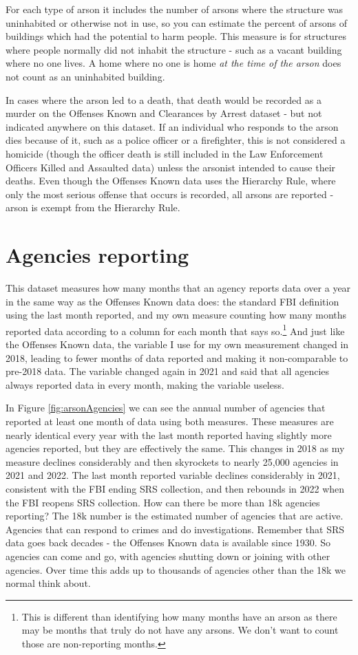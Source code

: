\documentclass[
]{krantz}
\begin{document}
For each type of arson it includes the number of arsons
where the structure was uninhabited or otherwise not in use,
so you can estimate the percent of arsons of buildings which
had the potential to harm people. This measure is for
structures where people normally did not inhabit the
structure - such as a vacant building where no one lives. A
home where no one is home \emph{at the time of the arson}
does not count as an uninhabited building.

In cases where the arson led to a death, that death would be
recorded as a murder on the Offenses Known and Clearances by
Arrest dataset - but not indicated anywhere on this dataset.
If an individual who responds to the arson dies because of
it, such as a police officer or a firefighter, this is not
considered a homicide (though the officer death is still
included in the Law Enforcement Officers Killed and
Assaulted data) unless the arsonist intended to cause their
deaths. Even though the Offenses Known data uses the
Hierarchy Rule, where only the most serious offense that
occurs is recorded, all arsons are reported - arson is
exempt from the Hierarchy Rule.

\section{Agencies reporting}\label{agencies-reporting-4}

This dataset measures how many months that an agency reports
data over a year in the same way as the Offenses Known data
does: the standard FBI definition using the last month
reported, and my own measure counting how many months
reported data according to a column for each month that says
so.\footnote{This is different than identifying how many
  months have an arson as there may be months that truly do
  not have any arsons. We don't want to count those are
  non-reporting months.} And just like the Offenses Known
data, the variable I use for my own measurement changed in
2018, leading to fewer months of data reported and making it
non-comparable to pre-2018 data. The variable changed again
in 2021 and said that all agencies always reported data in
every month, making the variable useless.

In Figure \ref{fig:arsonAgencies} we can see the annual
number of agencies that reported at least one month of data
using both measures. These measures are nearly identical
every year with the last month reported having slightly more
agencies reported, but they are effectively the same. This
changes in 2018 as my measure declines considerably and then
skyrockets to nearly 25,000 agencies in 2021 and 2022. The
last month reported variable declines considerably in 2021,
consistent with the FBI ending SRS collection, and then
rebounds in 2022 when the FBI reopens SRS collection. How
can there be more than 18k agencies reporting? The 18k
number is the estimated number of agencies that are active.
Agencies that can respond to crimes and do investigations.
Remember that SRS data goes back decades - the Offenses
Known data is available since 1930. So agencies can come and
go, with agencies shutting down or joining with other
agencies. Over time this adds up to thousands of agencies
other than the 18k we normal think about.
\end{document}
